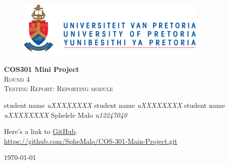 \begin{titlepage}
	\begin{center}
		
		\begin{figure}[t]
			\centering
			\includegraphics[width=350px]{images/UP_Logo.png}
		\end{figure}
		
		\textbf{\huge COS301 Mini Project } \\ 

		\textsc{\Large Round 4} \\
		\textsc{\large Testing Report: Reporting module } \\ 
		
		\begin{flushright} \large
			student name 		\emph{uXXXXXXXX} \newline
			student name 		\emph{uXXXXXXXX} \newline
			student name		\emph{uXXXXXXXX} \newline
			Sphelele Malo 		\emph{u12247040} \newline
			\end{flushright}
		
		\vfill
		
	Here's a link to \href{https://github.com/SpheMalo/COS-301-Main-Project.git}{GitHub}.\\
	\url{https://github.com/SpheMalo/COS-301-Main-Project.git}

	\vfill

	{\large \today}		
		
		
	\end{center}
\end{titlepage}
